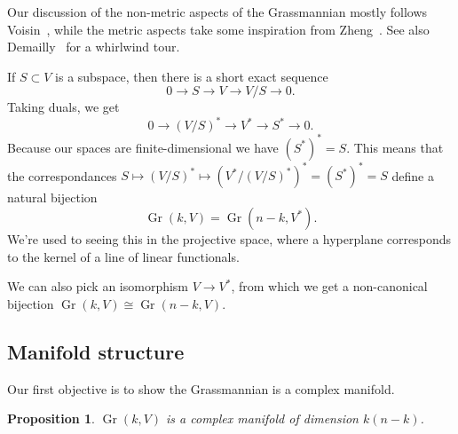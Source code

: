 \documentclass[11pt]{article}
\newtheorem{prop}[theo]{Proposition}
\DeclareMathOperator{\Gr}{Gr}
\begin{document}
Our discussion of the non-metric aspects of the Grassmannian mostly follows Voisin~\cite{voisin2002theorie}, while the metric aspects take some inspiration from Zheng~\cite{zheng2000complex}. See also Demailly~\cite[Chapter~5.16]{demailly-complex} for a whirlwind tour.

If $S \subset V$ is a subspace, then there is a short exact sequence
$$
0 \to S \to V \to V/S \to 0.
$$
Taking duals, we get
$$
0 \to (V/S)^* \to V^* \to S^* \to 0.
$$
Because our spaces are finite-dimensional we have $(S^*)^* = S$. This means that the correspondances $S \mapsto (V/S)^* \mapsto (V^* / (V/S)^*)^* = (S^*)^* = S$ define a natural bijection
$$
\Gr(k, V) = \Gr(n-k, V^*).
$$
We're used to seeing this in the projective space, where a hyperplane corresponds to the kernel of a line of linear functionals.

We can also pick an isomorphism $V \to V^*$, from which we get a non-canonical bijection $\Gr(k, V) \cong \Gr(n-k, V)$.

\subsection{Manifold structure}

Our first objective is to show the Grassmannian is a complex manifold.

\begin{prop}
$\Gr(k, V)$ is a complex manifold of dimension $k(n-k)$.
\end{prop}
\end{document}

